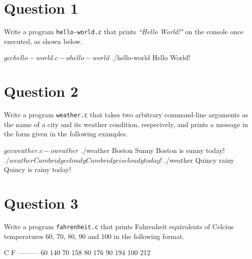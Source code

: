 \documentclass[12pt,letterpaper,twoside]{article}
\begin{document}


\section*{Question 1}

Write a program \texttt{hello-world.c} that prints \textit{``Hello World!"} on the console once executed, as shown below.

\begin{terminal}
$ gcc hello-world.c -o hello-world
$ ./hello-world
Hello World!
\end{terminal}

\section*{Question 2}

Write a program \texttt{weather.c} that takes two arbitrary command-line arguments as the name of a city and its weather condition, respecively, and prints a message in the form given in the following examples.

\begin{terminal}
$ gcc weather.c -o weather
$ ./weather Boston Sunny
Boston is sunny today!
$ ./weather Cambridge cloudy
Cambridge is cloudy today!
$ ./weather Quincy rainy
Quincy is rainy today!
\end{terminal}

\newpage

\section*{Question 3}

Write a program \texttt{fahrenheit.c} that prints Fahrenheit equivalents of Celcius temperatures 60, 70, 80, 90 and 100 in the following format.

\begin{terminal}
 C    F
---------
 60   140
 70   158
 80   176
 90   194
 100  212
\end{terminal}

\end{document}
